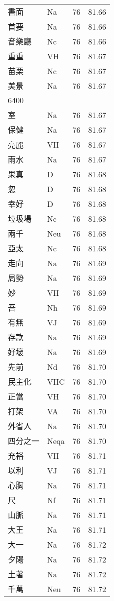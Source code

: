 \documentclass[twocolumn]{book}
\begin{document}
\begin{supertabular}{llrr}
書面 & Na & 76 &  81.66\\
首要 & Na & 76 &  81.66\\
音樂廳 & Nc & 76 &  81.66\\
重重 & VH & 76 &  81.67\\
苗栗 & Nc & 76 &  81.67\\
美景 & Na & 76 &  81.67\\
6400\\
室 & Na & 76 &  81.67\\
保健 & Na & 76 &  81.67\\
亮麗 & VH & 76 &  81.67\\
雨水 & Na & 76 &  81.67\\
果真 & D & 76 &  81.68\\
忽 & D & 76 &  81.68\\
幸好 & D & 76 &  81.68\\
垃圾場 & Nc & 76 &  81.68\\
兩千 & Neu & 76 &  81.68\\
亞太 & Nc & 76 &  81.68\\
走向 & Na & 76 &  81.69\\
局勢 & Na & 76 &  81.69\\
妙 & VH & 76 &  81.69\\
吾 & Nh & 76 &  81.69\\
有無 & VJ & 76 &  81.69\\
存款 & Na & 76 &  81.69\\
好壞 & Na & 76 &  81.69\\
先前 & Nd & 76 &  81.70\\
民主化 & VHC & 76 &  81.70\\
正當 & VH & 76 &  81.70\\
打架 & VA & 76 &  81.70\\
外省人 & Na & 76 &  81.70\\
四分之一 & Neqa & 76 &  81.70\\
充裕 & VH & 76 &  81.71\\
以利 & VJ & 76 &  81.71\\
心胸 & Na & 76 &  81.71\\
尺 & Nf & 76 &  81.71\\
山脈 & Na & 76 &  81.71\\
大王 & Na & 76 &  81.71\\
大一 & Na & 76 &  81.72\\
夕陽 & Na & 76 &  81.72\\
土著 & Na & 76 &  81.72\\
千萬 & Neu & 76 &  81.72\\

\end{supertabular}
\end{document}
